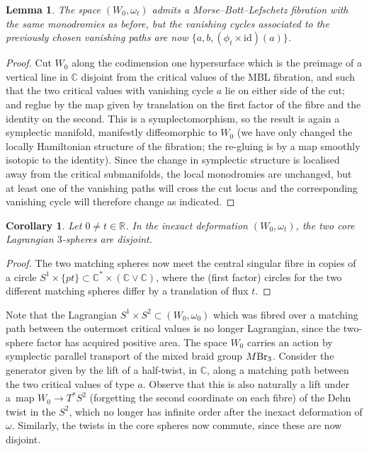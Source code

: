 \documentclass[pdftex]{sigma}
\def\bC{\mathbb{C}}
\def\bR{\mathbb{R}}
\newcommand{\id}{\mathrm{id}}
\newtheorem{lem}[thm]{Lemma}
\newtheorem{cor}[thm]{Corollary}
\theoremstyle{definition}
\numberwithin{equation}{section}
\begin{document}
\begin{lem}
The space $(W_0,\omega_t)$ admits a Morse--Bott--Lefschetz fibration with the same monodromies as before, but the vanishing cycles associated to the previously chosen vanishing paths are now $\{a,b,(\phi_t\times \id)(a)\}$.
\end{lem}

\begin{proof}
 Cut $W_0$ along the codimension one hypersurface which is the preimage of a vertical line in $\bC$ disjoint from the critical values of the MBL fibration, and such that the two critical values with vanishing cycle $a$ lie on either side of the cut; and reglue by the map given by translation on the first factor of the fibre and the identity on the second. This is a symplectomorphism, so the result is again a symplectic manifold, manifestly diffeomorphic to $W_0$ (we have only changed the locally Hamiltonian structure of the fibration; the re-gluing is by a map smoothly isotopic to the identity). Since the change in symplectic structure is localised away from the critical submanifolds, the local monodromies are unchanged, but at least one of the vanishing paths will cross the cut locus and the corresponding vanishing cycle will therefore change as indicated.
\end{proof}

\begin{cor}\label{cor:disjoinable}
 Let $0 \neq t \in \bR$. In the inexact deformation $(W_0,\omega_t)$, the two core Lagrangian $3$-spheres are disjoint.
\end{cor}

\begin{proof}
 The two matching spheres now meet the central singular fibre in copies of a circle $S^1 \times \{pt\} \subset \bC^*\times (\bC\vee\bC)$, where the (first factor) circles for the two different matching spheres differ by a translation of flux $t$.
\end{proof}

Note that the Lagrangian $S^1 \times S^2 \subset (W_0,\omega_0)$ which was fibred over a matching path between the outermost critical values is no longer Lagrangian, since the two-sphere factor has acquired positive area. The space $W_0$ carries an action by symplectic parallel transport of the mixed braid group $M{\rm Br}_3$. Consider the generator given by the lift of a half-twist, in $\bC$, along a matching path between the two critical values of type $a$. Observe that this is also naturally a lift under a~map $W_0 \to T^*S^2$ (forgetting the second coordinate on each fibre) of the Dehn twist in the $S^2$, which no longer has infinite order after the inexact deformation of $\omega$. Similarly, the twists in the core spheres now commute, since these are now disjoint.
\end{document}
